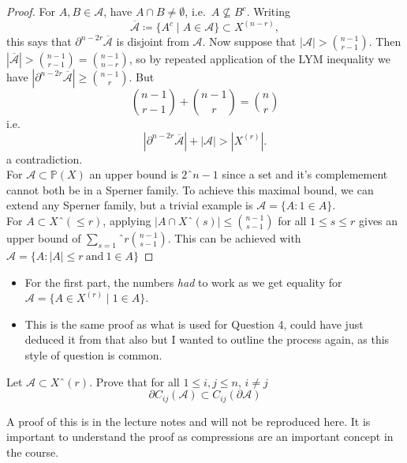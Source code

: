 \documentclass[a4paper]{article}
\newcommand{\shadow}{\partial}
\renewcommand{\P}{\mathbb{P}}
\renewcommand{\A}{\mathcal{A}}
\begin{document}
\begin{proof}
  For $A,B \in \mathcal{A}$, have $A \cap B \neq \emptyset$, i.e.\ $A \nsubseteq B^c$.
  Writing
  \begin{equation*}\overline{\mathcal{A}} \coloneqq \{A^c \mid A \in \mathcal{A}\} \subset X^{(n-r)},\end{equation*}
  this says that $\partial^{n-2r}\overline{\mathcal{A}}$ is disjoint from $\mathcal{A}$.
  Now suppose that $|\mathcal{A}| > \binom{n-1}{r-1}$.
  Then $|\overline{\mathcal{A}}| > \binom{n-1}{r-1} = \binom{n-1}{n-r}$, so by
  repeated application of the LYM inequality we have $|\partial^{n-2r} \overline{\mathcal{A}}| \geq \binom{n-1}{r}$.
  But
  \begin{equation*}
    \binom{n-1}{r-1} + \binom{n-1}{r} = \binom{n}{r}
  \end{equation*}
  i.e.\
  \begin{equation*}
    |\partial^{n-2r} \overline{\mathcal{A}}| + |\mathcal{A}| > |X^{(r)}|.
  \end{equation*}
  a contradiction.\\

  For $\mathcal{A} \subset \P(X)$ an upper bound is $2ˆ{n-1}$ since a set and
  it's complemement cannot both be in a Sperner family. To achieve this maximal
  bound, we can extend any Sperner family, but a trivial example is $\mathcal{A}
  = \{ A : 1 \in A\}$.\\

  For $A \subset Xˆ{(\leq r)}$, applying $|A \cap Xˆ{(s)}| \leq \binom{n-1}{s-1}$ for
  all $1 \leq s \leq r$ gives an upper bound of $\sum_{s=1}ˆ{r}
  \binom{n-1}{s-1}$. This can be achieved with $\A = \{ A : |A| \leq r
  \ \text{and} \ 1 \in A\}$ 
\end{proof}
\begin{remark}
  \begin{itemize}
  \item For the first part, the numbers \emph{had} to work as we get equality
    for $\mathcal{A} = \{A \in X^{(r)} \mid 1 \in A\}$.
  \item This is the same proof as what is used for Question 4, could have just
    deduced it from that also but I wanted to outline the process again, as this style of question is common.
  \end{itemize}
\end{remark}

\begin{question}[Question 6]
  Let $\A \subset Xˆ{(r)}$. Prove that for all $1 \leq i,j \leq n$, $i \neq j$
  \[\shadow{C_{ij}(\A)} \subset C_{ij}(\shadow{\A})\]
\end{question}
\begin{remark}
  A proof of this is in the lecture notes and will not be reproduced here. It is
  important to understand the proof as compressions are an important concept in
  the course.
\end{remark}
\end{document}
